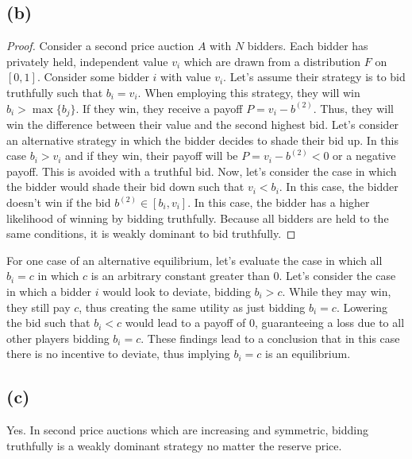 \documentclass[10pt,a4paper]{article}
\begin{document}
  \subsection*{(b)}
    \begin{proof}
      Consider a second price auction $A$ with $N$ bidders. Each bidder has privately held, independent value $v_i$ which are drawn from a distribution $F$ on $[0,1]$. Consider some bidder $i$ with value $v_i$. Let's assume their strategy is to bid truthfully such that $b_i=v_i$. When employing this strategy, they will win \iff $b_i > \max\{b_j\}$. If they win, they receive a payoff $P = v_i - b^{(2)}$. Thus, they will win the difference between their value and the second highest bid. Let's consider an alternative strategy in which the bidder decides to shade their bid up. In this case $b_i>v_i$ and if they win, their payoff will be $P = v_i - b^{(2)} < 0$ or a negative payoff. This is avoided with a truthful bid. Now, let's consider the case in which the bidder would shade their bid down such that $v_i<b_i$. In this case, the bidder doesn't win if the bid $b^{(2)}\in[b_i, v_i]$. In this case, the bidder has a higher likelihood of winning by bidding truthfully. Because all bidders are held to the same conditions, it is weakly dominant to bid truthfully.
    \end{proof}
    For one case of an alternative equilibrium, let's evaluate the case in which all $b_i = c$ in which $c$ is an arbitrary constant greater than $0$. Let's consider the case in which a bidder $i$ would look to deviate, bidding $b_i>c$. While they may win, they still pay $c$, thus creating the same utility as just bidding $b_i=c$. Lowering the bid such that $b_i<c$ would lead to a payoff of $0$, guaranteeing a loss due to all other players bidding $b_i=c$. These findings lead to a conclusion that in this case there is no incentive to deviate, thus implying $b_i=c$ is an equilibrium. 
  \subsection*{(c)}
    Yes. In second price auctions which are increasing and symmetric, bidding truthfully is a weakly dominant strategy no matter the reserve price.
\end{document}
